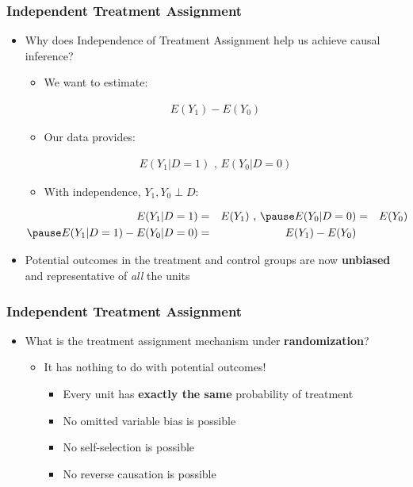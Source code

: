 \documentclass[xcolor=x11names,compress]{beamer}\usepackage[]{graphicx}\usepackage[]{color}
\renewcommand{\(}{\begin{columns}}
\renewcommand{\)}{\end{columns}}
\newcommand{\<}[1]{\begin{column}{#1}}
\renewcommand{\>}{\end{column}}
\begin{document}
\begin{frame}
\frametitle{Independent Treatment Assignment}
\begin{itemize}
\item Why does Independence of Treatment Assignment help us achieve causal inference?
\begin{itemize}
\item We want to estimate:
\end{itemize}
\begin{eqnarray}
E(Y_1) - E(Y_0)
\end{eqnarray}
\pause
\begin{itemize}
\item Our data provides:
\end{itemize}
\begin{eqnarray}
E(Y_1|D=1)\text{ ,   }E(Y_0|D=0)
\end{eqnarray}
\pause
\begin{itemize}
\item With independence, $Y_1, Y_0 \perp D$:
\end{itemize}
\begin{eqnarray}
E(Y_1|D=1) &=& E(Y_1) \text{ ,   }  \pause E(Y_0|D=0) &=& E(Y_0) \\
\pause
E(Y_1|D=1) - E(Y_0|D=0) &=& E(Y_1) - E(Y_0) \\
\end{eqnarray}
\item Potential outcomes in the treatment and control groups are now \textbf{unbiased} and representative of \textit{all} the units
\end{itemize}
\end{frame}

\begin{frame}
\frametitle{Independent Treatment Assignment}
\begin{itemize}
\item What is the treatment assignment mechanism under \textbf{randomization}?
\pause
\begin{itemize}
\item It has nothing to do with potential outcomes!
\begin{itemize}
\item Every unit has \textbf{exactly the same} probability of treatment
\item No omitted variable bias is possible
\item No self-selection is possible
\item No reverse causation is possible
\end{itemize}
\end{itemize}
\end{itemize}
\end{frame}
\end{document}
